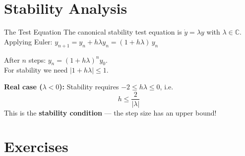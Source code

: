 \documentclass[12pt, a4paper]{article}
\begin{document}
\begin{center}
\end{center}

\section{Stability Analysis}

\begin{theorybox}{The Test Equation}
The canonical stability test equation is $\dot{y} = \lambda y$ with $\lambda \in \mathbb{C}$.\\
Applying Euler: $y_{n+1} = y_n + h\lambda y_n = (1 + h\lambda)\,y_n$

After $n$ steps: $y_n = (1+h\lambda)^n y_0$.\\
For stability we need $|1 + h\lambda| \leq 1$.

\textbf{Real case ($\lambda < 0$):} Stability requires $-2 \leq h\lambda \leq 0$, i.e.\
\[
  h \leq \frac{2}{|\lambda|}
\]
This is the \textbf{stability condition} — the step size has an upper bound!
\end{theorybox}

\section{Exercises}
\end{document}
